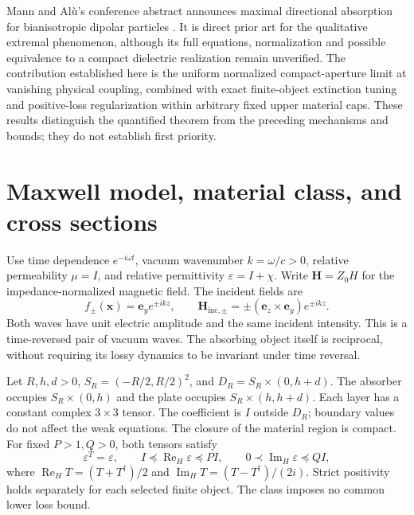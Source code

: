 \documentclass[11pt]{article}
\newcommand{\ReH}{\operatorname{Re}_{\!H}}
\newcommand{\ImH}{\operatorname{Im}_{\!H}}
\newcommand{\ey}{\mathbf e_y}
\newcommand{\ez}{\mathbf e_z}
\begin{document}
Mann and Al\`u's conference abstract announces maximal directional absorption for bianisotropic dipolar particles \citep{MannAlu2023}. It is direct prior art for the qualitative extremal phenomenon, although its full equations, normalization and possible equivalence to a compact dielectric realization remain unverified. The contribution established here is the uniform normalized compact-aperture limit at vanishing physical coupling, combined with exact finite-object extinction tuning and positive-loss regularization within arbitrary fixed upper material caps. These results distinguish the quantified theorem from the preceding mechanisms and bounds; they do not establish first priority.

\section{Maxwell model, material class, and cross sections}\label{sec:model}
Use time dependence $e^{-i\omega t}$, vacuum wavenumber $k=\omega/c>0$, relative permeability $\mu=I$, and relative permittivity $\varepsilon=I+\chi$. Write $\mathbf H=Z_0H$ for the impedance-normalized magnetic field. The incident fields are
\begin{equation}\label{eq:incident}
 f_\pm(\mathbf x)=\ey e^{\pm ikz},\qquad
 \mathbf H_{\mathrm{inc},\pm}=\pm(\ez\times\ey)e^{\pm ikz}.
\end{equation}
Both waves have unit electric amplitude and the same incident intensity. This is a time-reversed pair of vacuum waves. The absorbing object itself is reciprocal, without requiring its lossy dynamics to be invariant under time reversal.

Let $R,h,d>0$, $S_R=(-R/2,R/2)^2$, and $D_R=S_R\times(0,h+d)$. The absorber occupies $S_R\times(0,h)$ and the plate occupies $S_R\times(h,h+d)$. Each layer has a constant complex $3\times3$ tensor. The coefficient is $I$ outside $D_R$; boundary values do not affect the weak equations. The closure of the material region is compact. For fixed $P>1,Q>0$, both tensors satisfy
\begin{equation}\label{eq:material}
 \varepsilon^T=\varepsilon,\qquad
 I\preceq\ReH\varepsilon\preceq PI,\qquad
 0\prec\ImH\varepsilon\preceq QI,
\end{equation}
where $\ReH T=(T+T^\dagger)/2$ and $\ImH T=(T-T^\dagger)/(2i)$. Strict positivity holds separately for each selected finite object. The class imposes no common lower loss bound.
\end{document}
